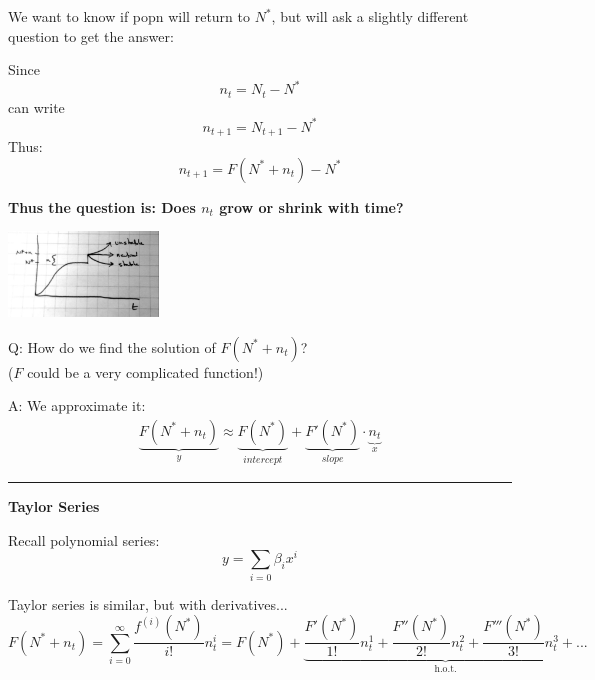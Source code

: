 \documentclass{article}
\newcommand{\ind}{\-\hspace{1cm}}
\begin{document}
We want to know if popn will return to $N^*$, but will ask a slightly different question to get the answer:

\vspace{0.5cm}

Since 
\begin{equation*}
	n_t=N_t-N^*
\end{equation*}
can write
\begin{equation*}
	n_{t+1}=N_{t+1}-N^*
\end{equation*}
Thus:
\begin{equation*}
	n_{t+1} = F(N^* + n_t) - N^*
\end{equation*}

\begin{center}
	\textbf{Thus the question is:  Does $n_t$ grow or shrink with time?}
\end{center}

\begin{center}
\includegraphics[width=4cm]{figs/Perturb.pdf}
\end{center}

Q: How do we find the solution of $F(N^* + n_t)$?\\
\ind  ($F$ could be a very complicated function!)

A: We approximate it:
\begin{align*}
	\underbrace{F(N^* + n_t)}_y \approx \underbrace{F(N^*)}_{intercept}+ \underbrace{F'(N^*)}_{slope}  \cdot \underbrace{n_t}_x
\end{align*}

\rule[0.5ex]{\linewidth}{1pt}

\textbf{Taylor Series}

Recall polynomial series:
\begin{equation*}
	y=\sum_{i=0}\beta_i x^i
\end{equation*}

Taylor series is similar, but with derivatives...
\begin{equation*}
	F(N^*+n_t)= \sum_{i=0}^\infty \frac{f^{(i)}(N^*)}{i!}n_t^i = F(N^*) + \underbrace{\frac{F'(N^*)}{1!}n_t^1 + \frac{F''(N^*)}{2!} n_t^2 + \frac{F'''(N^*) }{3!}n_t^3 + ...}_{\text{h.o.t.}}
\end{equation*}
\end{document}
